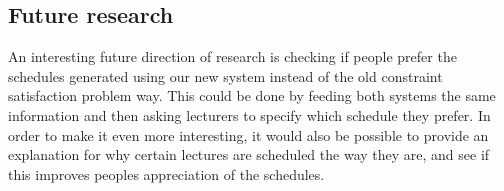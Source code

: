 \subsection{Future research}
An interesting future direction of research is checking if people prefer
the schedules generated using our new system instead of the old constraint
satisfaction problem way. This could be done by feeding both systems
the same information and then asking lecturers to specify which schedule
they prefer. In order to make it even more interesting, it would also be
possible to provide an explanation for why certain lectures are scheduled
the way they are, and see if this improves peoples appreciation of the
schedules.

